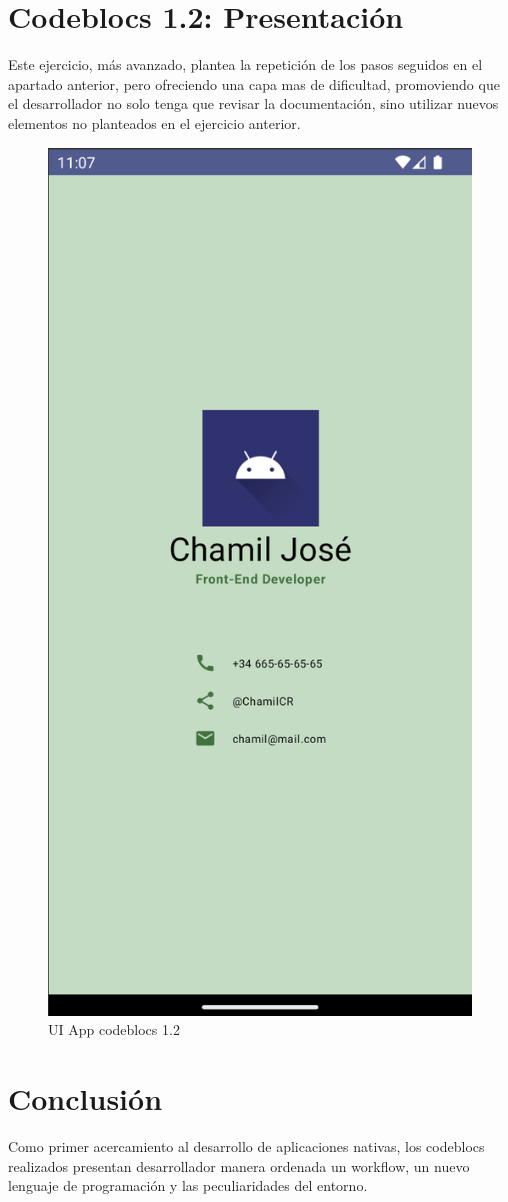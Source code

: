 \documentclass{scrartcl}
\begin{document}
    \section{Codeblocs 1.2: Presentación}
        Este ejercicio, más avanzado, plantea la repetición de los pasos seguidos en el apartado anterior,
        pero ofreciendo una capa mas de dificultad, promoviendo que el desarrollador no solo tenga que revisar
        la documentación, sino utilizar nuevos elementos no planteados en el ejercicio anterior.
         \begin{figure}
            \centerline{\includegraphics[scale=0.4]{presentacion}}
            \caption{UI App codeblocs 1.2}
            \label{fig:presentacion}
         \end{figure}
    
    \section{Conclusión}
         Como primer acercamiento al desarrollo de aplicaciones nativas, los codeblocs realizados presentan desarrollador
         manera ordenada un workflow, un nuevo lenguaje de programación y las peculiaridades del entorno.
\end{document}
